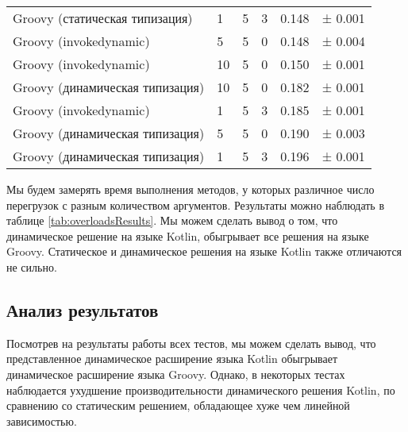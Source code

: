 \begin{table}[h]
\begin{center}
\begin{tabular}{|l|p{}|p{}|p{}|p{}|l|}
Groovy (статическая типизация)  & 1 & 5 & 3                 & 0.148 & ±  0.001 \\
Groovy (invokedynamic)          & 5 & 5 & 0                 & 0.148 & ±  0.004 \\
Groovy (invokedynamic)          & 10 & 5 & 0                & 0.150 & ±  0.001 \\
Groovy (динамическая типизация) & 10 & 5 & 0                & 0.182 & ±  0.001 \\
Groovy (invokedynamic)          & 1 & 5 & 3                 & 0.185 & ±  0.001 \\
Groovy (динамическая типизация) & 5 & 5 & 0                 & 0.190 & ±  0.003 \\
Groovy (динамическая типизация) & 1 & 5 & 3                 & 0.196 & ±  0.001 \\
\hline
\end{tabular}
\end{center}
\end{table} 

Мы будем замерять время выполнения методов, у которых различное число перегрузок с разным количеством аргументов. Результаты можно наблюдать в таблице  \ref{tab:overloadsResults}. Мы можем сделать вывод о том, что динамическое решение на языке Kotlin, обыгрывает все решения на языке Groovy. Статическое и динамическое решения на языке Kotlin также отличаются не сильно.


\subsection{Анализ результатов}

Посмотрев на результаты работы всех тестов, мы можем сделать вывод, что представленное динамическое расширение языка Kotlin обыгрывает динамическое расширение языка Groovy. Однако, в некоторых тестах наблюдается ухудшение производительности динамического решения Kotlin, по сравнению со статическим решением, обладающее хуже чем линейной зависимостью. 